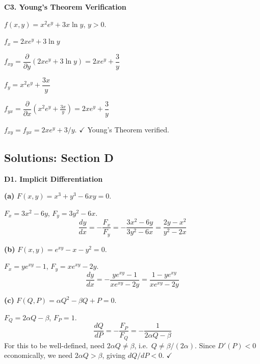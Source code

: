 \documentclass[12pt, a4paper]{article}
\theoremstyle{definition}
\newcommand{\ddd}[2]{\dfrac{d#1}{d#2}}
\begin{document}
\begin{solbox}
\textbf{C3. Young's Theorem Verification}

$f(x,y) = x^2e^y + 3x\ln y$, $y>0$.

$f_x = 2xe^y + 3\ln y$

$f_{xy} = \dfrac{\partial}{\partial y}(2xe^y+3\ln y) = 2xe^y + \dfrac{3}{y}$

$f_y = x^2 e^y + \dfrac{3x}{y}$

$f_{yx} = \dfrac{\partial}{\partial x}\!\left(x^2e^y+\frac{3x}{y}\right) = 2xe^y + \dfrac{3}{y}$

$f_{xy} = f_{yx} = 2xe^y + 3/y$. $\checkmark$ Young's Theorem verified.
\end{solbox}

\subsection{Solutions: Section D}

\begin{solbox}
\textbf{D1. Implicit Differentiation}

\textbf{(a)} $F(x,y) = x^3+y^3-6xy = 0$.

$F_x = 3x^2-6y$, \quad $F_y = 3y^2-6x$.
\[
  \ddd{y}{x} = -\frac{F_x}{F_y} = -\frac{3x^2-6y}{3y^2-6x}
             = \frac{2y-x^2}{y^2-2x}
\]

\textbf{(b)} $F(x,y) = e^{xy}-x-y^2 = 0$.

$F_x = ye^{xy}-1$, \quad $F_y = xe^{xy}-2y$.
\[
  \ddd{y}{x} = -\frac{ye^{xy}-1}{xe^{xy}-2y}
             = \frac{1-ye^{xy}}{xe^{xy}-2y}
\]

\textbf{(c)} $F(Q,P) = \alpha Q^2-\beta Q+P = 0$.

$F_Q = 2\alpha Q-\beta$, \quad $F_P = 1$.
\[
  \ddd{Q}{P} = -\frac{F_P}{F_Q} = -\frac{1}{2\alpha Q-\beta}
\]
For this to be well-defined, need $2\alpha Q\neq\beta$, i.e.\ $Q\neq\beta/(2\alpha)$.
Since $D'(P)<0$ economically, we need $2\alpha Q>\beta$, giving $dQ/dP<0$. $\checkmark$
\end{solbox}
\end{document}
